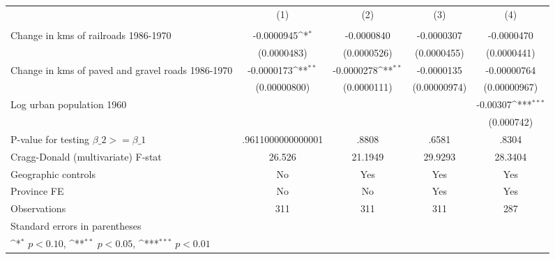 {
\def\sym#1{\ifmmode^{#1}\else\(^{#1}\)\fi}
\begin{tabular}{l*{4}{c}}
\hline\hline
                &\multicolumn{1}{c}{(1)}&\multicolumn{1}{c}{(2)}&\multicolumn{1}{c}{(3)}&\multicolumn{1}{c}{(4)}\\
                &\multicolumn{1}{c}{}&\multicolumn{1}{c}{}&\multicolumn{1}{c}{}&\multicolumn{1}{c}{}\\
\hline
Change in kms of railroads 1986-1970&-0.0000945\sym{*}  &-0.0000840         &-0.0000307         &-0.0000470         \\
                &(0.0000483)         &(0.0000526)         &(0.0000455)         &(0.0000441)         \\
[1em]
Change in kms of paved and gravel roads 1986-1970&-0.0000173\sym{**} &-0.0000278\sym{**} &-0.0000135         &-0.00000764         \\
                &(0.00000800)         &(0.0000111)         &(0.00000974)         &(0.00000967)         \\
[1em]
Log urban population 1960&                  &                  &                  & -0.00307\sym{***}\\
                &                  &                  &                  &(0.000742)         \\
\hline
P-value for testing $\beta\_{2} >= \beta\_{1}$&.9611000000000001         &    .8808         &    .6581         &    .8304         \\
Cragg-Donald (multivariate) F-stat&   26.526         &  21.1949         &  29.9293         &  28.3404         \\
Geographic controls&       No         &      Yes         &      Yes         &      Yes         \\
Province FE     &       No         &       No         &      Yes         &      Yes         \\
Observations    &      311         &      311         &      311         &      287         \\
\hline\hline
\multicolumn{5}{l}{\footnotesize Standard errors in parentheses}\\
\multicolumn{5}{l}{\footnotesize \sym{*} \(p<0.10\), \sym{**} \(p<0.05\), \sym{***} \(p<0.01\)}\\
\end{tabular}
}
